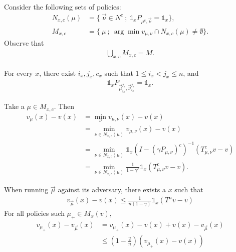 \documentclass{article}
\def\1{{\mathds 1}}
\begin{document}
Consider the following sets of policies:
\begin{align}
  N_{x,c}(\mu) & = \{~ \vec\nu \in N^c ~;~ \1_x P_{\mu^c,\vec\nu} = \1_x \}, \\
  M_{x,c} &= \{~ \mu ~;~ \arg\min v_{\mu,\nu} \cap N_{x,c}(\mu) \neq \emptyset \}.
\end{align}
Observe that
\begin{align}
  \bigcup_{x,c} M_{x,c} = M.
\end{align}

For every $x$, there exist $i_x, j_x, c_x$ such that $1 \le i_x < j_x \le n$,  and
\begin{align}
  \1_x P_{\vec\mu_{i_x}^{j_x},\vec\nu_{i_x}^{j_x}} = \1_x.
\end{align}


Take a $\mu \in M_{x,c}$.
Then
\begin{align}
  v_\mu(x) - v(x) & = \min_\nu v_{\mu,\nu}(x) - v(x) \\
  & = \min_{\nu \in N_{x,c}(\mu)} v_{\mu,\nu}(x) - v(x) \\
  & = \min_{\nu \in N_{x,c}(\mu)} \1_x (I-(\gamma P_{\mu,\nu})^c)^{-1}(T_{\mu,\nu}^c v - v) \\
  & = \min_{\nu \in N_{x,c}(\mu)} \frac{1}{1-\gamma^c}\1_x(T_{\mu,\nu}^c v - v).
\end{align}

When running $\vec\mu$ against its adversary, there exists a $x$ such that
\begin{align}
  v_{\vec\mu}(x) - v(x) \le  \frac{1}{n(1-\gamma)} \1_x(T^n v - v)
\end{align}
For all policies such $\mu_+ \in M_x(v)$,
\begin{align}
  v_{\mu_+}(x) - v_{\vec\mu}(x) &= v_{\mu_+}(x) - v(x) + v(x) - v_{\vec\mu}(x) \\
  & \le (1-\frac{2}{n}) (v_{\mu_+}(x)-v(x))
\end{align}



 
\end{document}
